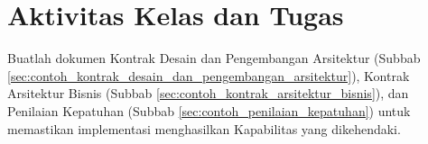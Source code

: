 \section{Aktivitas Kelas dan Tugas}

Buatlah dokumen Kontrak Desain dan Pengembangan Arsitektur (Subbab \ref{sec:contoh_kontrak_desain_dan_pengembangan_arsitektur}), Kontrak Arsitektur Bisnis (Subbab \ref{sec:contoh_kontrak_arsitektur_bisnis}), dan Penilaian Kepatuhan (Subbab \ref{sec:contoh_penilaian_kepatuhan}) untuk memastikan implementasi menghasilkan Kapabilitas yang dikehendaki.